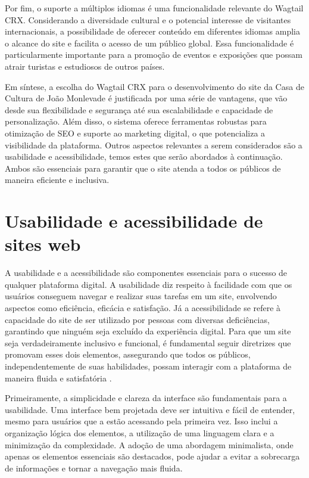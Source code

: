 Por fim, o suporte a múltiplos idiomas é uma funcionalidade relevante do Wagtail CRX. Considerando a diversidade cultural e o potencial interesse de visitantes internacionais, a possibilidade de oferecer conteúdo em diferentes idiomas amplia o alcance do site e facilita o acesso de um público global. Essa funcionalidade é particularmente importante para a promoção de eventos e exposições que possam atrair turistas e estudiosos de outros países.

Em síntese, a escolha do Wagtail CRX para o desenvolvimento do site da Casa de Cultura de João Monlevade é justificada por uma série de vantagens, que vão desde sua flexibilidade e segurança até sua escalabilidade e capacidade de personalização. Além disso, o sistema oferece ferramentas robustas para otimização de \ac{SEO} e suporte ao marketing digital, o que potencializa a visibilidade da plataforma. Outros aspectos relevantes a serem considerados são a usabilidade e acessibilidade, temos estes que serão abordados à continuação. Ambos são essenciais para garantir que o site atenda a todos os públicos de maneira eficiente e inclusiva.

\section{Usabilidade e acessibilidade de sites web}

A usabilidade e a acessibilidade são componentes essenciais para o sucesso de qualquer plataforma digital. A usabilidade diz respeito à facilidade com que os usuários conseguem navegar e realizar suas tarefas em um site, envolvendo aspectos como eficiência, eficácia e satisfação. Já a acessibilidade se refere à capacidade do site de ser utilizado por pessoas com diversas deficiências, garantindo que ninguém seja excluído da experiência digital. Para que um site seja verdadeiramente inclusivo e funcional, é fundamental seguir diretrizes que promovam esses dois elementos, assegurando que todos os públicos, independentemente de suas habilidades, possam interagir com a plataforma de maneira fluida e satisfatória \cite{rodrigues2008acessibilidade}.

Primeiramente, a simplicidade e clareza da interface são fundamentais para a usabilidade. Uma interface bem projetada deve ser intuitiva e fácil de entender, mesmo para usuários que a estão acessando pela primeira vez. Isso inclui a organização lógica dos elementos, a utilização de uma linguagem clara e a minimização da complexidade. A adoção de uma abordagem minimalista, onde apenas os elementos essenciais são destacados, pode ajudar a evitar a sobrecarga de informações e tornar a navegação mais fluida.

